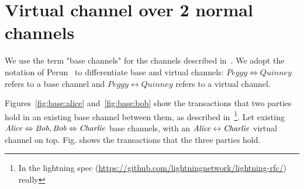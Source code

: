 \section{Virtual channel over 2 normal channels}
  We use the term "base channels" for the channels described
  in~\cite{lightning}. We adopt the notation of
  Perun~\cite{DBLP:conf/ccs/DziembowskiFH18} to differentiate base and virtual
  channels: $\mathit{Peggy} \Leftrightarrow \mathit{Quinney}$ refers to a base
  channel and $\mathit{Peggy} \leftrightarrow \mathit{Quinney}$ refers to a
  virtual channel.

  Figures~\ref{fig:base:alice} and~\ref{fig:base:bob} show the transactions that
  two parties hold in an existing base channel between them, as described
  in~\cite{lightning}\footnote{In the lightning spec
  (\url{https://github.com/lightningnetwork/lightning-rfc/}) really}. Let
  existing $\mathit{Alice} \Leftrightarrow \mathit{Bob}, \mathit{Bob} \Leftrightarrow \mathit{Charlie}$ base
  channels, with an $\mathit{Alice} \leftrightarrow \mathit{Charlie}$ virtual channel on top.
  Fig. shows the transactions that the three parties hold.

